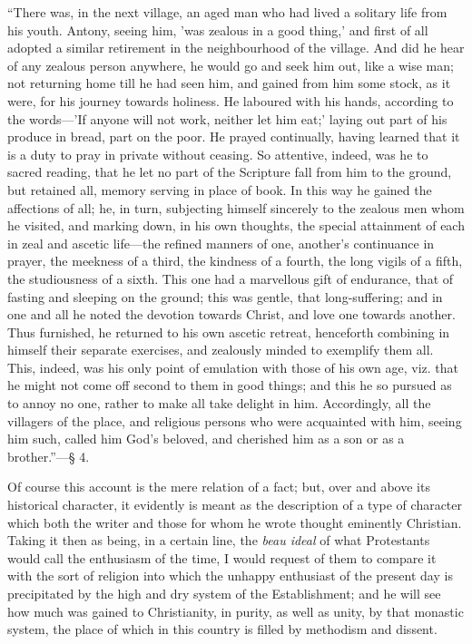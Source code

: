 ``There was, in the next village, an aged man who had lived a
solitary life from his youth. Antony, seeing him, 'was zealous in a
good thing,' and first of all adopted a similar retirement in the
neighbourhood of the village. And did he hear of any zealous person
anywhere, he would go and seek him out, like a wise man; not returning
home till he had seen him, and gained from him some stock, as it were,
for his journey towards holiness. He laboured
with his hands, according to the words—'If anyone will not work,
neither let him eat;' laying out part of his produce in bread, part on
the poor. He prayed continually, having learned that it is a duty to
pray in private without ceasing. So attentive, indeed, was he to
sacred reading, that he let no part of the Scripture fall from him to
the ground, but retained all, memory serving in place of book. In this
way he gained the affections of all; he, in turn, subjecting himself
sincerely to the zealous men whom he visited, and marking down, in his
own thoughts, the special attainment of each in zeal and ascetic life—the
refined manners of one, another's continuance in prayer, the meekness
of a third, the kindness of a fourth, the long vigils of a fifth, the
studiousness of a sixth. This one had a marvellous gift of endurance,
that of fasting and sleeping on the ground; this was gentle, that
long-suffering; and in one and all he noted the devotion towards
Christ, and love one towards another. Thus furnished, he returned to
his own ascetic retreat, henceforth combining in himself their
separate exercises, and zealously minded to exemplify them all. This,
indeed, was his only point of emulation with those of his own age,
viz. that he might not come off second to them in good things; and
this he so pursued as to annoy no one, rather to make all take delight
in him. Accordingly, all the villagers of the place, and religious
persons who were acquainted with him, seeing him such, called him God's
beloved, and cherished him as a son or as a brother.''—§ 4.

Of course this account is the mere relation of a fact; but, over
and above its historical character, it evidently is meant as the
description of a type of character which both the writer and those for
whom he wrote thought eminently Christian. Taking it then as being, in
a certain line, the \emph{beau ideal} of what Protestants would call
the enthusiasm of the time, I would request of them to compare it with
the sort of religion into which the unhappy enthusiast of the present
day is precipitated by the high and dry system of the Establishment;
and he will see how much was gained to Christianity, in purity, as
well as unity, by that monastic system, the place of which in
this country is filled by methodism and dissent.


